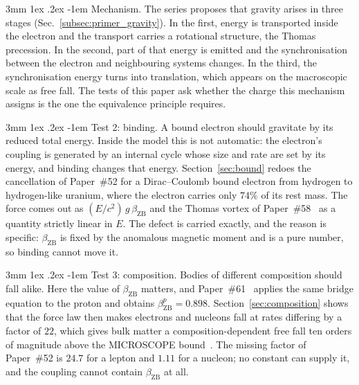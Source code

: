 \documentclass[%
 reprint, amsmath,amssymb, aps, prb, ]{revtex4-2}
\makeatletter
\numberwithin{equation}{section}
\renewcommand\paragraph{%
  \@startsection{paragraph}{4}{\z@}%
    {3mm \@plus 1ex \@minus .2ex}%
    {-1em}%
    {\normalfont\normalsize\itshape}}
\newcommand{\betaZB}{\beta_{\text{ZB}}}
\makeatother
\begin{document}
\paragraph{Mechanism.} The series proposes that gravity arises in three stages (Sec.~\ref{subsec:primer_gravity}). In the first, energy is transported inside the electron and the transport carries a rotational structure, the Thomas precession. In the second, part of that energy is emitted and the synchronisation between the electron and neighbouring systems changes. In the third, the synchronisation energy turns into translation, which appears on the macroscopic scale as free fall. The tests of this paper ask whether the charge this mechanism assigns is the one the equivalence principle requires.

\paragraph{Test 2: binding.} A bound electron should gravitate by its reduced total energy. Inside the model this is not automatic: the electron's coupling is generated by an internal cycle whose size and rate are set by its energy, and binding changes that energy. Section~\ref{sec:bound} redoes the cancellation of Paper~\#52 for a Dirac--Coulomb bound electron from hydrogen to hydrogen-like uranium, where the electron carries only $74\%$ of its rest mass. The force comes out as $(E/c^{2})\,g\,\betaZB$ and the Thomas vortex of Paper~\#58~\cite{hanamura58} as a quantity strictly linear in $E$. The defect is carried exactly, and the reason is specific: $\betaZB$ is fixed by the anomalous magnetic moment and is a pure number, so binding cannot move it.

\paragraph{Test 3: composition.} Bodies of different composition should fall alike. Here the value of $\betaZB$ matters, and Paper~\#61~\cite{hanamura61} applies the same bridge equation to the proton and obtains $\betaZB^{p} = 0.898$. Section~\ref{sec:composition} shows that the force law then makes electrons and nucleons fall at rates differing by a factor of $22$, which gives bulk matter a composition-dependent free fall ten orders of magnitude above the MICROSCOPE bound~\cite{microscope2022}. The missing factor of Paper~\#52 is $24.7$ for a lepton and $1.11$ for a nucleon; no constant can supply it, and the coupling cannot contain $\betaZB$ at all.
\end{document}
